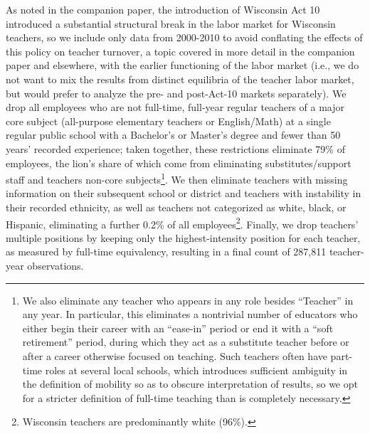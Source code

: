 \documentclass[12pt,]{article}
\let\rmarkdownfootnote\footnote%
\def\footnote{\protect\rmarkdownfootnote}
\begin{document}
As noted in the companion paper, the introduction of Wisconsin Act 10
introduced a substantial structural break in the labor market for
Wisconsin teachers, so we include only data from 2000-2010 to avoid
conflating the effects of this policy on teacher turnover, a topic
covered in more detail in the companion paper and elsewhere, with the
earlier functioning of the labor market (i.e., we do not want to mix the
results from distinct equilibria of the teacher labor market, but would
prefer to analyze the pre- and post-Act-10 markets separately). We drop
all employees who are not full-time, full-year regular teachers of a
major core subject (all-purpose elementary teachers or English/Math) at
a single regular public school with a Bachelor's or Master's degree and
fewer than 50 years' recorded experience; taken together, these
restrictions eliminate 79\% of employees, the lion's share of which come
from eliminating substitutes/support staff and teachers non-core
subjects\footnote{We also eliminate any teacher who appears in any role
  besides ``Teacher'' in any year. In particular, this eliminates a
  nontrivial number of educators who either begin their career with an
  ``ease-in'' period or end it with a ``soft retirement'' period, during
  which they act as a substitute teacher before or after a career
  otherwise focused on teaching. Such teachers often have part-time
  roles at several local schools, which introduces sufficient ambiguity
  in the definition of mobility so as to obscure interpretation of
  results, so we opt for a stricter definition of full-time teaching
  than is completely necessary.}. We then eliminate teachers with
missing information on their subsequent school or district and teachers
with instability in their recorded ethnicity, as well as teachers not
categorized as white, black, or Hispanic, eliminating a further 0.2\% of
all employees\footnote{Wisconsin teachers are predominantly white
  (96\%).}. Finally, we drop teachers' multiple positions by keeping
only the highest-intensity position for each teacher, as measured by
full-time equivalency, resulting in a final count of 287,811
teacher-year observations.
\end{document}
